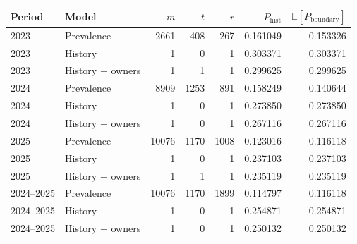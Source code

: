 \begin{tabular}{@{}llrrrrr@{}}
\toprule
Period & Model & $m$ & $t$ & $r$ & $P_{\mathrm{hist}}$ & $\mathbb{E}[P_{\text{boundary}}]$\\
\midrule
2023 & Prevalence & 2661 & 408 & 267 & 0.161049 & 0.153326\\
2023 & History & 1 & 0 & 1 & 0.303371 & 0.303371\\
2023 & History + owners & 1 & 1 & 1 & 0.299625 & 0.299625\\
2024 & Prevalence & 8909 & 1253 & 891 & 0.158249 & 0.140644\\
2024 & History & 1 & 0 & 1 & 0.273850 & 0.273850\\
2024 & History + owners & 1 & 0 & 1 & 0.267116 & 0.267116\\
2025 & Prevalence & 10076 & 1170 & 1008 & 0.123016 & 0.116118\\
2025 & History & 1 & 0 & 1 & 0.237103 & 0.237103\\
2025 & History + owners & 1 & 1 & 1 & 0.235119 & 0.235119\\
2024--2025 & Prevalence & 10076 & 1170 & 1899 & 0.114797 & 0.116118\\
2024--2025 & History & 1 & 0 & 1 & 0.254871 & 0.254871\\
2024--2025 & History + owners & 1 & 0 & 1 & 0.250132 & 0.250132\\
\bottomrule
\end{tabular}

